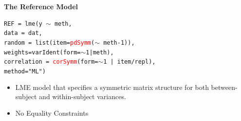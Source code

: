 \documentclass[compress]{beamer}        %
\makeatletter
\newcommand{\tcb}{\textcolor{beamer@blendedblue}}
\newcommand{\tcr}{\textcolor{red}}
\makeatother
\begin{document}
%		


		\begin{frame}[fragile]{\bf \tcb{The Reference Model}}
				\vspace{-1cm}
			\begin{framed}
			\texttt{REF = lme(y $\sim$ meth,\\
				\hspace{0.6cm} data = dat,\\
				\hspace{0.6cm} random = list(item=\tcr{pdSymm}($\sim$ meth-1)), \\
				\hspace{0.6cm} weights=varIdent(form=$\sim$1|meth),\\
				\hspace{0.6cm} correlation = \tcr{corSymm}(form=$\sim$1 | item/repl),\\
				\hspace{0.6cm} method="ML")}\\
			\end{framed}
			\begin{itemize}
				\item LME model that specifies a symmetric matrix structure for both between-subject and within-subject variances.
				\item No Equality Constraints
			\end{itemize}
			
		\end{frame}
		
\end{document}
